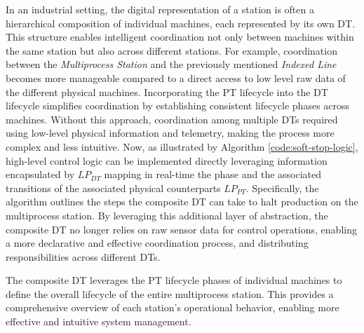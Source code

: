 In an industrial setting, the digital representation of a station is often a hierarchical composition of individual machines, each represented by its own DT. This structure enables intelligent coordination not only between machines within the same station but also across different stations. For example, coordination between the \textit{Multiprocess Station} and the previously mentioned \textit{Indexed Line} becomes more manageable compared to a direct access to low level raw data of the different physical machines. Incorporating the PT lifecycle into the DT lifecycle simplifies coordination by establishing consistent lifecycle phases across machines.
Without this approach, coordination among multiple DTs required using low-level physical information and telemetry, making the process more complex and less intuitive. Now, as illustrated by Algorithm \ref{code:soft-stop-logic}, high-level control logic can be implemented directly leveraging information encapsulated by $LP_{DT}$ mapping in real-time the phase and the associated transitions of the associated physical counterparts $LP_{PT}$. Specifically, the algorithm outlines the steps the composite DT can take to halt production on the multiprocess station. By leveraging this additional layer of abstraction, the composite DT no longer relies on raw sensor data for control operations, enabling a more declarative and effective coordination process, and distributing responsibilities across different DTs.

The composite DT leverages the PT lifecycle phases of individual machines to define the overall lifecycle of the entire multiprocess station. This provides a comprehensive overview of each station's operational behavior, enabling more effective and intuitive system management.

